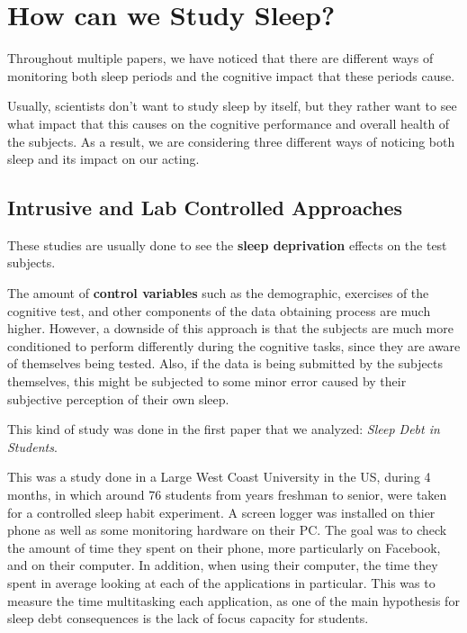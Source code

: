 \documentclass[]{IEEEtran}
\begin{document}
\section{How can we Study Sleep?}

Throughout multiple papers, we have noticed that there are different ways of monitoring both sleep periods and the cognitive impact that these periods cause. \par 

Usually, scientists don't want to study sleep by itself, but they rather want to see what impact that this causes on the cognitive performance and overall health of the subjects. As a result, we are considering three different ways of noticing both sleep and its impact on our acting.

\subsection{Intrusive and Lab Controlled Approaches}

These studies are usually done to see the \textbf{sleep deprivation} effects on the test subjects. \par 

The amount of \textbf{control variables} such as the demographic, exercises of the cognitive test, and other components of the data obtaining process are much higher. However, a downside of this approach is that the subjects are much more conditioned to perform differently during the cognitive tasks, since they are aware of themselves being tested. Also, if the data is being submitted by the subjects themselves, this might be subjected to some minor error caused by their subjective perception of their own sleep. \par 

This kind of study was done in the first paper that we analyzed: \textit{Sleep Debt in Students}. \par 

This was a study done in a Large West Coast University in the US, during 4 months, in which around 76 students from years freshman to senior, were taken for a controlled sleep habit experiment. A screen logger was installed on thier phone as well as some monitoring hardware on their PC. The goal was to check the amount of time they spent on their phone, more particularly on Facebook, and on their computer. In addition, when using their computer, the time they spent in average looking at each of the applications in particular. This was to measure the time multitasking each application, as one of the main hypothesis for sleep debt consequences is the lack of focus capacity for students. \par
\end{document}

